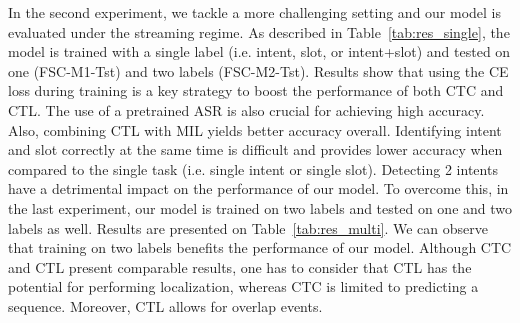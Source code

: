 \documentclass[a4paper]{article}
\begin{document}
In the second experiment, we tackle a more challenging setting and our model is evaluated under the streaming regime. As described in Table~\ref{tab:res_single}, the model is trained with a single label (i.e. intent, slot, or intent+slot) and tested on one (FSC-M1-Tst) and two labels (FSC-M2-Tst). Results show that using the CE loss during training is a key strategy to boost the performance of both CTC and CTL. The use of a pretrained ASR is also crucial for achieving high accuracy. Also, combining CTL with MIL yields better accuracy overall. Identifying intent and slot correctly at the same time is difficult and provides lower accuracy when compared to the single task (i.e. single intent or single slot). Detecting 2 intents have a detrimental impact on the performance of our model. To overcome this, in the last experiment, our model is trained on two labels and tested on one and two labels as well. Results are presented on Table~\ref{tab:res_multi}. We can observe that training on two labels benefits the performance of our model. Although CTC and CTL present comparable results, one has to consider that CTL has the potential for performing localization, whereas CTC is limited to predicting a sequence. Moreover, CTL allows for overlap events.



\begin{table}
\centering
\caption{Results on multi-intent classification. The training set consists of 2 labels and the testing set contains utterances with 1 and 2 labels, referred to as FSC-M1-Tst and FSC-M2-Tst.}
\label{tab:res_multi}
\end{table}
\end{document}

